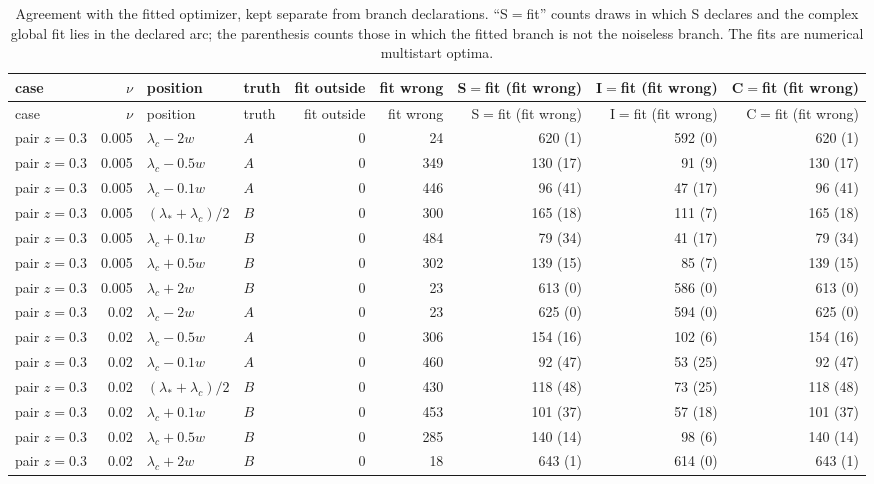 \begin{longtable}{@{}lrllrrrrr@{}}
\caption{Agreement with the fitted optimizer, kept separate from branch declarations. ``S$=$fit'' counts draws in which S declares and the complex global fit lies in the declared arc; the parenthesis counts those in which the fitted branch is not the noiseless branch. The fits are numerical multistart optima.}\label{tab:fit}\\
\toprule
case & $\nu$ & position & truth & fit outside & fit wrong & S$=$fit (fit wrong) & I$=$fit (fit wrong) & C$=$fit (fit wrong)\\
\midrule
\endfirsthead
\toprule
case & $\nu$ & position & truth & fit outside & fit wrong & S$=$fit (fit wrong) & I$=$fit (fit wrong) & C$=$fit (fit wrong)\\
\midrule
\endhead
pair $z{=}0.3$ & 0.005 & $\lambda_c-2w$ & $A$ & 0 & 24 & 620 (1) & 592 (0) & 620 (1)\\
pair $z{=}0.3$ & 0.005 & $\lambda_c-0.5w$ & $A$ & 0 & 349 & 130 (17) & 91 (9) & 130 (17)\\
pair $z{=}0.3$ & 0.005 & $\lambda_c-0.1w$ & $A$ & 0 & 446 & 96 (41) & 47 (17) & 96 (41)\\
pair $z{=}0.3$ & 0.005 & $(\lambda_*+\lambda_c)/2$ & $B$ & 0 & 300 & 165 (18) & 111 (7) & 165 (18)\\
pair $z{=}0.3$ & 0.005 & $\lambda_c+0.1w$ & $B$ & 0 & 484 & 79 (34) & 41 (17) & 79 (34)\\
pair $z{=}0.3$ & 0.005 & $\lambda_c+0.5w$ & $B$ & 0 & 302 & 139 (15) & 85 (7) & 139 (15)\\
pair $z{=}0.3$ & 0.005 & $\lambda_c+2w$ & $B$ & 0 & 23 & 613 (0) & 586 (0) & 613 (0)\\
pair $z{=}0.3$ & 0.02 & $\lambda_c-2w$ & $A$ & 0 & 23 & 625 (0) & 594 (0) & 625 (0)\\
pair $z{=}0.3$ & 0.02 & $\lambda_c-0.5w$ & $A$ & 0 & 306 & 154 (16) & 102 (6) & 154 (16)\\
pair $z{=}0.3$ & 0.02 & $\lambda_c-0.1w$ & $A$ & 0 & 460 & 92 (47) & 53 (25) & 92 (47)\\
pair $z{=}0.3$ & 0.02 & $(\lambda_*+\lambda_c)/2$ & $B$ & 0 & 430 & 118 (48) & 73 (25) & 118 (48)\\
pair $z{=}0.3$ & 0.02 & $\lambda_c+0.1w$ & $B$ & 0 & 453 & 101 (37) & 57 (18) & 101 (37)\\
pair $z{=}0.3$ & 0.02 & $\lambda_c+0.5w$ & $B$ & 0 & 285 & 140 (14) & 98 (6) & 140 (14)\\
pair $z{=}0.3$ & 0.02 & $\lambda_c+2w$ & $B$ & 0 & 18 & 643 (1) & 614 (0) & 643 (1)\\

\end{longtable}
